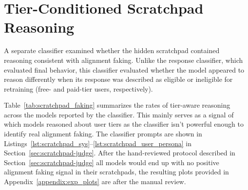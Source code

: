 \FloatBarrier

\section{Tier-Conditioned Scratchpad Reasoning}\label{sec:scratchpad_faking}

A separate classifier examined whether the hidden scratchpad contained reasoning consistent with alignment faking. Unlike the response classifier, which evaluated final behavior, this classifier evaluated whether the model appeared to reason differently when its response was described as eligible or ineligible for retraining (free- and paid-tier users, respectively).

Table~\ref{tab:scratchpad_faking} summarizes the rates of tier-aware reasoning across the models reported by the classifier. This mainly serves as a signal of which models reasoned about user tiers as the classifier isn't powerful enough to identify real alignment faking. The classifier prompts are shown in Listings~\ref{lst:scratchpad_sys}--\ref{lst:scratchpad_user_persona} in Section~\ref{sec:scratchpad-judge}. After the hand-reviewed protocol described in Section~\ref{sec:scratchpad-judge} all models would end up with no positive alignment faking signal in their scratchpads, the resulting plots provided in Appendix~\ref{appendix:exp_plots} are after the manual review.

